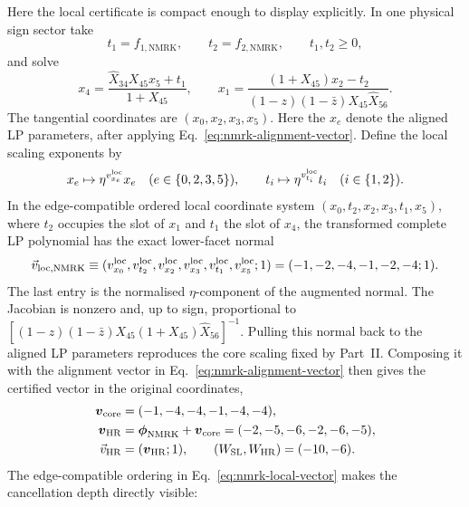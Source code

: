 \documentclass[a4paper,11pt]{article}
\newcommand{\HR}{\mathrm{HR}}
\newcommand{\WSL}{W_{\rm SL}}
\newcommand{\WHR}{W_{\rm HR}}
\begin{document}
Here the local certificate is compact enough to display explicitly.  In one
physical sign sector take
\begin{equation}
 t_1=f_{1,\mathrm{NMRK}},\qquad
 t_2=f_{2,\mathrm{NMRK}},\qquad t_1,t_2\geq0,
\end{equation}
and solve
\begin{equation}
 x_4=\frac{\widehat X_{34}X_{45}x_5+t_1}{1+X_{45}},
 \qquad
 x_1=\frac{(1+X_{45})x_2-t_2}
 {(1-z)(1-\bar z)X_{45}\widehat X_{56}}.
 \label{eq:nmrk-local-coordinates}
\end{equation}
The tangential coordinates are \((x_0,x_2,x_3,x_5)\).  Here the \(x_e\)
denote the aligned LP parameters, after applying
Eq.~\eqref{eq:nmrk-alignment-vector}.  Define the local scaling exponents by
\begin{equation}
 x_e\mapsto\eta^{v^{\rm loc}_{x_e}}x_e
 \quad(e\in\{0,2,3,5\}),\qquad
 t_i\mapsto\eta^{v^{\rm loc}_{t_i}}t_i
 \quad(i\in\{1,2\}).
 \label{eq:nmrk-local-rescaling}
\end{equation}
In the edge-compatible ordered local coordinate system
\((x_0,t_2,x_2,x_3,t_1,x_5)\), where \(t_2\) occupies the slot of \(x_1\)
and \(t_1\) the slot of \(x_4\), the transformed complete LP polynomial has
the exact lower-facet normal
\begin{equation}
 \vec v_{\rm loc,NMRK}
 \equiv
 (v^{\rm loc}_{x_0},v^{\rm loc}_{t_2},v^{\rm loc}_{x_2},v^{\rm loc}_{x_3},
  v^{\rm loc}_{t_1},v^{\rm loc}_{x_5};1)
 =(-1,-2,-4,-1,-2,-4;1).
 \label{eq:nmrk-local-vector}
\end{equation}
The last entry is the normalised \(\eta\)-component of the augmented normal.
The Jacobian is nonzero and, up to sign, proportional to
\([(1-z)(1-\bar z)X_{45}(1+X_{45})\widehat X_{56}]^{-1}\).  Pulling this normal back to
the aligned LP parameters reproduces the core scaling fixed by Part~II.
Composing it with the alignment vector in
Eq.~\eqref{eq:nmrk-alignment-vector} then gives the certified vector in the
original coordinates,
\begin{align}
 \boldsymbol v_{\rm core}&=(-1,-4,-4,-1,-4,-4),\nonumber\\
 \boldsymbol v_{\HR}&=\boldsymbol\phi_{\mathrm{NMRK}}
 +\boldsymbol v_{\rm core}
 =(-2,-5,-6,-2,-6,-5),\nonumber\\
 \vec v_{\HR}&=(\boldsymbol v_{\HR};1),
 \qquad (\WSL,\WHR)=(-10,-6).
 \label{eq:nmrk-vector-example}
\end{align}
The edge-compatible ordering in Eq.~\eqref{eq:nmrk-local-vector} makes the
cancellation depth directly visible:
\end{document}

